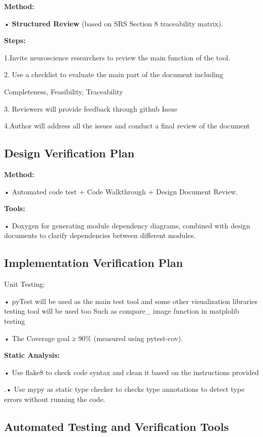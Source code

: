 \documentclass[
]{article}
\begin{document}
\textbf{Method:}

• \textbf{Structured Review} (based on SRS Section 8 traceability
matrix).

\textbf{Steps:}

1.Invite neuroscience researchers to review the main function of the
tool.

2. Use a checklist to evaluate the main part of the document including

Completeness, Feasibility, Traceability

3. Reviewers will provide feedback through github Issue

4.Author will address all the issues and conduct a final review of the
document

\hypertarget{design-verification-plan}{%
\subsection{Design Verification Plan}\label{design-verification-plan}}

\textbf{Method:}

• Automated code test + Code Walkthrough + Design Document Review.

\textbf{Tools:}

• Doxygen for generating module dependency diagrams, combined with
design documents to clarify dependencies between different modules.

\hypertarget{implementation-verification-plan}{%
\subsection{Implementation Verification
Plan}\label{implementation-verification-plan}}

Unit Testing:

• pyTest will be used as the main test tool and some other visualization
libraries testing tool will be used too Such as compare\_ image function
in matplolib testing

• The Coverage goal ≥ 90\% (measured using pytest-cov).

\textbf{Static Analysis:}

• Use flake8 to check code syntax and clean it based on the instructions
provided

.• Use mypy as static type checker to checks type annotations to detect
type errors without running the code.

\hypertarget{automated-testing-and-verification-tools}{%
\subsection{Automated Testing and Verification
Tools}\label{automated-testing-and-verification-tools}}
\end{document}

